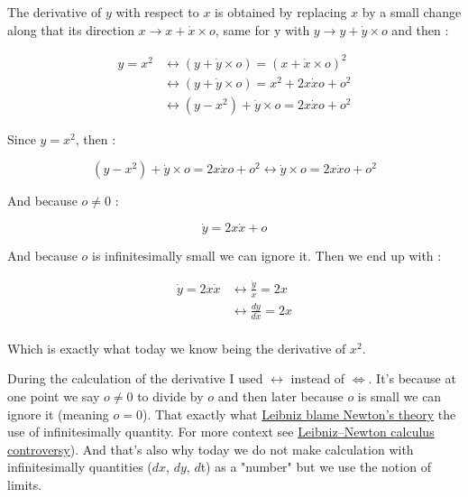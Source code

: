 \documentclass[12pt]{article}
\begin{document}
The derivative of $y$ with respect to $x$ is obtained by replacing $x$ by a small change along that its direction $x \rightarrow x + \dot{x} \times o$, same for y with $y \rightarrow y + \dot{y} \times o$ and then :

\begin{equation*}
    \begin{split}
        y = x^2 & \leftrightarrow  (y + \dot{y} \times o) = (x + \dot{x} \times o)^2 \\
            & \leftrightarrow  (y + \dot{y} \times o) = x^2 +2x\dot{x}o + o^2 \\
            & \leftrightarrow  (y - x^2) + \dot{y} \times o = 2x\dot{x}o + o^2
    \end{split}
\end{equation*}

Since $y=x^2$, then :

$$
(y - x^2) + \dot{y} \times o = 2x\dot{x}o + o^2  \leftrightarrow \dot{y} \times o = 2x\dot{x}o + o^2 
$$

And because $o \neq 0$ : 


$$
\dot{y} = 2x\dot{x} + o
$$

And because $o$ is infinitesimally small we can ignore it. Then we end up with :

\begin{equation*}
    \begin{split}
        \dot{y} = 2x\dot{x} & \leftrightarrow \frac{\dot{y}}{\dot{x}} = 2x\\
                            & \leftrightarrow \frac{dy}{dx} = 2x\\
    \end{split}
\end{equation*}

Which is exactly what today we know being the derivative of $x^2$.

During the calculation of the derivative I used $\leftrightarrow$ instead of $\Leftrightarrow$. It's because at one point we say $o \neq 0$ to divide by $o$ and then later because $o$ is small we can ignore it (meaning $o=0$). That exactly what \href{https://en.wikipedia.org/wiki/History_of_calculus}{Leibniz blame Newton's theory} the use of infinitesimally quantity. For more context see \href{https://en.wikipedia.org/wiki/Leibniz\%E2\%80\%93Newton_calculus_controversy}{Leibniz–Newton calculus controversy}). And that's also why today we do not make calculation with infinitesimally quantities ($dx$, $dy$, $d$t) as a "number" but we use the notion of limits.
\end{document}
